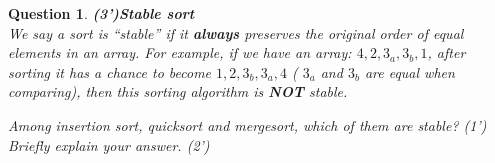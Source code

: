 \documentclass[10.5pt]{article}
\newtheorem{Q}{Question}
\begin{document}
	\begin{Q}\textbf{(3')Stable sort}\\
        We say a sort is ``stable'' if it \textbf{always} preserves the original order of equal elements in an array. For example, if we have an array: $4, 2, 3_a, 3_b, 1$, after sorting it has a chance to become $1, 2, 3_b, 3_a, 4$ ( $3_a$ and $3_b$ are equal when comparing), then this sorting algorithm is \textbf{NOT} stable.
        
        Among insertion sort, quicksort and mergesort, which of them are stable? (1') Briefly explain your answer. (2')
	\end{Q}
	
\pagebreak
	
\end{document}
